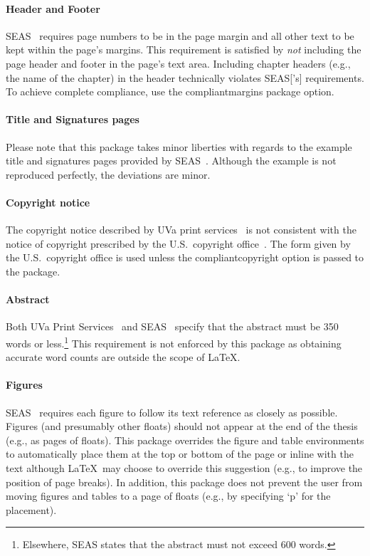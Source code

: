 \documentclass[10pt]{article}
\newcommand{\option}[1]{#1}
\begin{document}
\paragraph{Header and Footer}
\Gls{SEAS}~\cite{seas:instructions} requires page numbers to be in the page margin and all other text to be kept within the page's margins.
This requirement is satisfied by \emph{not} including the page header and footer in the page's text area.
Including chapter headers (e.g., the name of the chapter) in the header technically violates \gls{SEAS}['s] requirements.
To achieve complete compliance, use the \option{compliantmargins} package option.

\paragraph{Title and Signatures pages}
Please note that this package takes minor liberties with regards to the example title and signatures pages provided by \Gls{SEAS}~\cite{seas:instructions}.
Although the example is not reproduced perfectly, the deviations are minor.

\paragraph{Copyright notice}
The copyright notice described by \gls{UVa} print services~\cite{uvaprint:thesis} is not consistent with the notice of copyright prescribed by the U.S.\ copyright office~\cite{copyright2010copyright}.
The form given by the U.S.\ copyright office is used unless the \option{compliantcopyright} option is passed to the package.

\paragraph{Abstract}
Both \Gls{UVa} Print Services~\cite{uvaprint:thesis} and \gls{SEAS}~\cite{seas:instructions} specify that the abstract must be 350 words or less.\footnote{
  Elsewhere, \gls{SEAS} states that the abstract must not exceed 600 words.
}
This requirement is not enforced by this package as obtaining accurate word counts are outside the scope of \LaTeX.

\paragraph{Figures}
\Gls{SEAS}~\cite{seas:instructions} requires each figure to follow its text reference as closely as possible.
Figures (and presumably other floats) should not appear at the end of the thesis (e.g., as pages of floats).
This package overrides the figure and table environments to automatically place them at the top or bottom of the page or inline with the text although \LaTeX\ may choose to override this suggestion (e.g., to improve the position of page breaks).
In addition, this package does not prevent the user from moving figures and tables to a page of floats (e.g., by specifying `p' for the placement).
\end{document}
